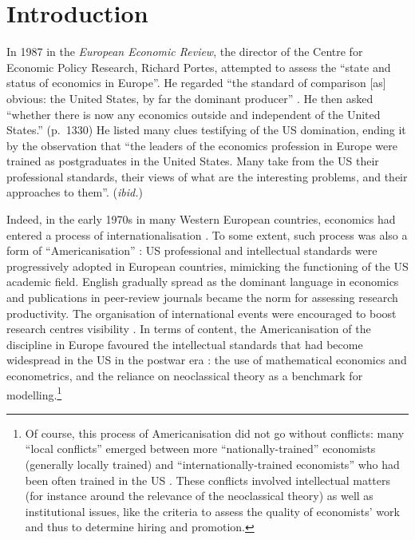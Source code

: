 \documentclass[]{elsarticle} %
\begin{document}
\hypertarget{introduction}{%
\section{Introduction}\label{introduction}}

In 1987 in the \emph{European Economic Review}, the director of the
Centre for Economic Policy Research, Richard Portes, attempted to assess
the ``state and status of economics in Europe''. He regarded ``the
standard of comparison {[}as{]} obvious: the United States, by far the
dominant producer'' \citep[1329]{portes1987}. He then asked ``whether
there is now any economics outside and independent of the United
States.'' (p.~1330) He listed many clues testifying of the US
domination, ending it by the observation that ``the leaders of the
economics profession in Europe were trained as postgraduates in the
United States. Many take from the US their professional standards, their
views of what are the interesting problems, and their approaches to
them''. (\emph{ibid.})

Indeed, in the early 1970s in many Western European countries, economics
had entered a process of internationalisation \citep[chapters 3 and
4]{fourcade2006, fourcade2009}. To some extent, such process was also a
form of ``Americanisation'' \citep{coats1996, goutsmedt2021}: US
professional and intellectual standards were progressively adopted in
European countries, mimicking the functioning of the US academic field.
English gradually spread as the dominant language in economics
\citep{sandelin1997} and publications in peer-review journals became the
norm for assessing research productivity. The organisation of
international events were encouraged to boost research centres
visibility \citep{cherrier2021, goutsmedt2021}. In terms of content, the
Americanisation of the discipline in Europe favoured the intellectual
standards that had become widespread in the US in the postwar era
\citep{morgan1998}: the use of mathematical economics and econometrics,
and the reliance on neoclassical theory as a benchmark for
modelling.\footnote{Of course, this process of Americanisation did not
  go without conflicts: many ``local conflicts'' emerged between more
  ``nationally-trained'' economists (generally locally trained) and
  ``internationally-trained economists'' who had been often trained in
  the US \citep{fourcade2006}. These conflicts involved intellectual
  matters (for instance around the relevance of the neoclassical theory)
  as well as institutional issues, like the criteria to assess the
  quality of economists' work and thus to determine hiring and
  promotion.}
\end{document}
